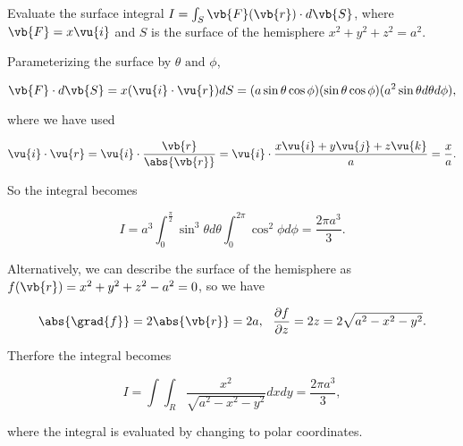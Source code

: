 \documentclass[english,a4paper,12pt]{report}
\begin{document}
{Evaluate the surface integral \( I = \int_{S}^{} \vb{F}(\vb{r} ) \cdot d\vb{S} \), where \(\vb{F}  = x \vu{i}  \) and \(S\) is the surface of the hemisphere \(x^2 + y^2 + z^2 = a^2\).}
{Parameterizing the surface by \(\theta \text { and } \phi \), 

\begin{equation}
	\vb{F} \cdot d\vb{S}  = x(\vu{i} \cdot \vu{r} )dS = (a \sin \theta \cos \phi )(\sin \theta \cos \phi )(a^2\sin \theta d \theta d\phi ),
\end{equation}

where we have used

\begin{equation}
	\vu{i} \cdot \vu{r} = \vu{i} \cdot \frac{\vb{r} }{\abs{\vb{r} } } = \vu{i} \cdot \frac{x \vu{i} + y \vu{j} + z \vu{k} }{a} = \frac{x}{a}.
\end{equation}

So the integral becomes

\begin{equation}
	I = a^3 \int_{0}^{\frac{\pi }{2} } \sin ^3 \theta d \theta \int_{0}^{2\pi } \cos ^2\phi d\phi = \frac{2\pi a^3 }{3}.    
\end{equation}

Alternatively, we can describe the surface of the hemisphere as \(f(\vb{r}) = x^2 + y^2 + z^2 - a^2 = 0\), so we have 

\begin{equation}
	\abs{\grad{f} } = 2\abs{\vb{r} } = 2a, ~~ 	\frac{\partial f}{\partial z} = 2z = 2\sqrt{a^2-x^2-y^2}.
\end{equation}

Therfore the integral becomes

\begin{equation}
	I = \int \int_{R}^{} \frac{x^2}{\sqrt{a^2-x^2-y^2} }dxdy = \frac{2\pi a^3 }{3},
\end{equation}

where the integral is evaluated by changing to polar coordinates.
 } 
 
\end{document}
